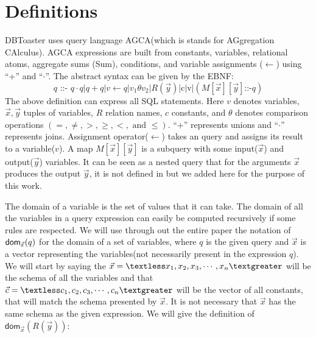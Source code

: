 \documentclass[12pt]{article}
\newcommand{\dom}{\textsf{dom}}
\begin{document}
\section{Definitions}
DBToaster uses query language AGCA(which is stands for AGgregation CAlculus). 
AGCA expressions are built from constants, variables, relational atoms, aggregate sums (Sum), conditions, and variable assignments ($\gets$) using ``+''  and ``$\cdot$''. The abstract syntax can be given by the EBNF:
\begin{equation}
\label{def:agca}
q\text{ ::- }q\cdot q | q + q|v \gets q |v_{1}\theta v_{2}|R(\vec{y})|\text{c}|\text{v}|(M[\vec{x}][\vec{y}]\text{::-}q)
\end{equation}
The above definition can express all SQL statements. Here $v$ denotes variables, $\vec{x},\vec{y}$ tuples of variables, $R$ relation names, $c$ constants, and $\theta$ denotes comparison operations $(=,\neq, >, \geq, <, \text{ and }\leq)$.
 ``+'' represents unions and ``$\cdot$'' represents joins. Assignment operator($\gets$) takes an query and assigns its result to a variable($v$). A map $M[\vec{x}][\vec{y}]$ is a subquery with some input($\vec{x}$) and output($\vec{y}$) variables. It can be seen as a nested query that for the arguments $\vec{x}$ produces the output $\vec{y}$, it is not defined in \cite{1} but we added here for the purpose of this work.

The domain of a variable is the set of values that it can take. The domain of all the variables in a query expression can easily be computed recursively if some rules are respected. We will use through out the entire paper the notation of $\text{\dom{}}_{\vec x}(q)$ for the domain of a set of variables, where $q$ is the given query and $\vec x$ is a vector representing the variables(not necessarily present in the expression $q$). We will start by saying the $\vec x=\textless x_1,x_2,x_3,\cdots,x_n\textgreater$ will be the schema of all the variables 
and that $\vec c=\textless c_1,c_2,c_3,\cdots,c_n\textgreater$ will be the vector of all constants, that will match the schema presented by $\vec x$. It is not necessary that $\vec{x}$  has the same schema as the given expression. We will give the definition of $\dom{}_{\vec x}(R(\vec y))$:

\end{document}

